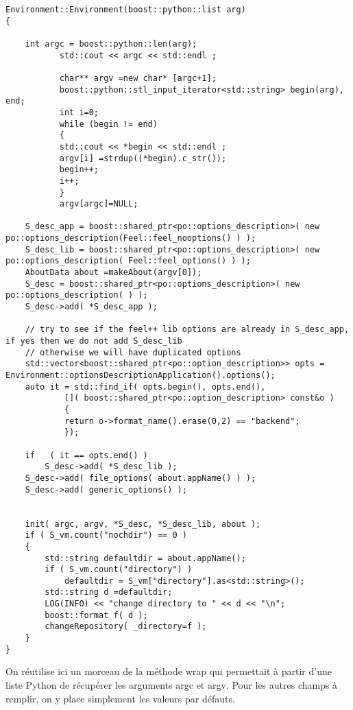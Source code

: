 \documentclass[12pt]{article}
\begin{document}
\begin{lstlisting}
Environment::Environment(boost::python::list arg)
{
    
    int argc = boost::python::len(arg);
           std::cout << argc << std::endl ;

           char** argv =new char* [argc+1];
           boost::python::stl_input_iterator<std::string> begin(arg), end;
           int i=0;
           while (begin != end)
           {
           std::cout << *begin << std::endl ;
           argv[i] =strdup((*begin).c_str());
           begin++;
           i++;
           }
           argv[argc]=NULL;

    S_desc_app = boost::shared_ptr<po::options_description>( new po::options_description(Feel::feel_nooptions() ) );
    S_desc_lib = boost::shared_ptr<po::options_description>( new po::options_description( Feel::feel_options() ) );
    AboutData about =makeAbout(argv[0]);
    S_desc = boost::shared_ptr<po::options_description>( new po::options_description( ) );
    S_desc->add( *S_desc_app );

    // try to see if the feel++ lib options are already in S_desc_app, if yes then we do not add S_desc_lib
    // otherwise we will have duplicated options
    std::vector<boost::shared_ptr<po::option_description>> opts = Environment::optionsDescriptionApplication().options();
    auto it = std::find_if( opts.begin(), opts.end(),
            []( boost::shared_ptr<po::option_description> const&o )
            {
            return o->format_name().erase(0,2) == "backend";
            });

    if   ( it == opts.end() )
        S_desc->add( *S_desc_lib );
    S_desc->add( file_options( about.appName() ) );
    S_desc->add( generic_options() );


    init( argc, argv, *S_desc, *S_desc_lib, about );
    if ( S_vm.count("nochdir") == 0 )
    {
        std::string defaultdir = about.appName();
        if ( S_vm.count("directory") )
            defaultdir = S_vm["directory"].as<std::string>();
        std::string d =defaultdir;
        LOG(INFO) << "change directory to " << d << "\n";
        boost::format f( d );
        changeRepository( _directory=f );
    }
}
\end{lstlisting}

On réutilise ici un morceau de la méthode wrap qui permettait à partir d'une liste Python de récupérer les arguments argc et argv. Pour les autres champs à remplir, on y place simplement les valeurs par défauts.
\end{document}
